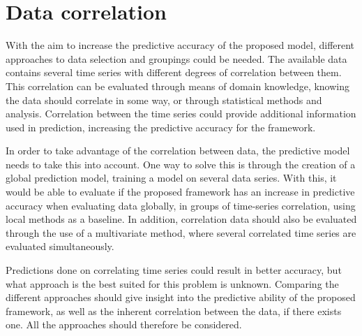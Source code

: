 \section{Data correlation}
\label{section:Architecture:Data}

With the aim to increase the predictive accuracy of the proposed model,
different approaches to data selection and groupings could be needed.
The available data contains several time series with different degrees of correlation between them.
This correlation can be evaluated through means of domain knowledge,
knowing the data should correlate in some way, or through statistical methods and analysis.
Correlation between the time series could provide additional information used in prediction,
increasing the predictive accuracy for the framework.

In order to take advantage of the correlation between data,
the predictive model needs to take this into account.
One way to solve this is through the creation of a global prediction model,
training a model on several data series.
With this, it would be able to evaluate if the proposed framework has an increase in predictive accuracy
when evaluating data globally, in groups of time-series correlation, using local methods as a baseline.
In addition, correlation data should also be evaluated through the use of a multivariate method,
where several correlated time series are evaluated simultaneously.


Predictions done on correlating time series could result in better accuracy,
but what approach is the best suited for this problem is unknown.
Comparing the different approaches should give insight into the predictive ability of the proposed framework,
as well as the inherent correlation between the data, if there exists one.
All the approaches should therefore be considered.

